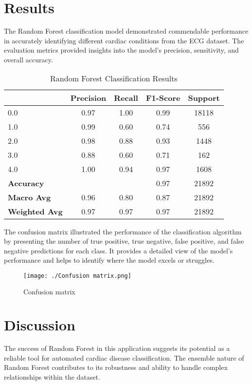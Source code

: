 \documentclass[a4paper, 12pt]{article}
\begin{document}
\section{Results}
The Random Forest classification model demonstrated commendable performance in accurately identifying different cardiac conditions from the ECG dataset. The evaluation metrics provided insights into the model's precision, sensitivity, and overall accuracy. 
\begin{table}[H]
    \centering
    \begin{tabular}{lcccc}
        \toprule
        & Precision & Recall & F1-Score & Support \\
        \midrule
        0.0 & 0.97 & 1.00 & 0.99 & 18118 \\
        1.0 & 0.99 & 0.60 & 0.74 & 556 \\
        2.0 & 0.98 & 0.88 & 0.93 & 1448 \\
        3.0 & 0.88 & 0.60 & 0.71 & 162 \\
        4.0 & 1.00 & 0.94 & 0.97 & 1608 \\
        \midrule
        \textbf{Accuracy} & & & 0.97 & 21892 \\
        \textbf{Macro Avg} & 0.96 & 0.80 & 0.87 & 21892 \\
        \textbf{Weighted Avg} & 0.97 & 0.97 & 0.97 & 21892 \\
        \bottomrule
    \end{tabular}
    \caption{Random Forest Classification Results}
    \label{tab:classification_results}
\end{table}
The confusion matrix illustrated the performance of the classification algorithm by presenting the number of true positive, true negative, false positive, and false negative predictions for each class. It provides a detailed view of the model's performance and helps to identify where the model excels or struggles.
\begin{figure}[h]
    \centering
    \begin{minipage}{0.45\textwidth}
        \centering
        \texttt{[image: ./Confusion matrix.png]}
        \caption{Confusion matrix}
        \label{fig:Confusion matrix}
    \end{minipage}\hfill
\end{figure}

\section{Discussion}
The success of Random Forest in this application suggests its potential as a reliable tool for automated cardiac disease classification. The ensemble nature of Random Forest contributes to its robustness and ability to handle complex relationships within the dataset.
\end{document}
